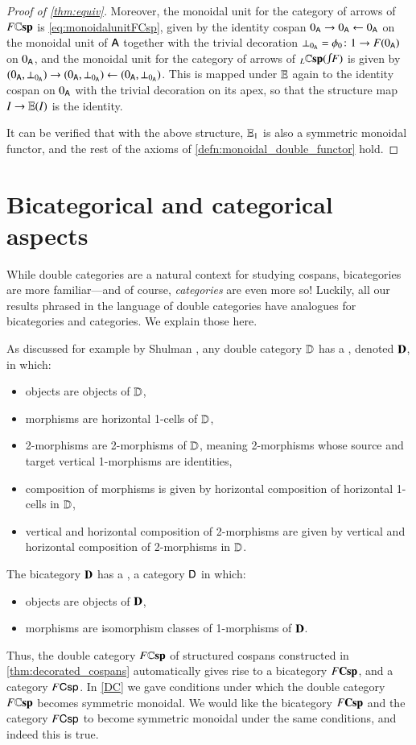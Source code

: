 \documentclass[reqno]{amsart}
\begin{document}
\begin{proof}[Proof of \cref{thm:equiv}]
Moreover, the monoidal unit for the category of arrows of $F\mathbf{\mathbb Csp}$ is \cref{eq:monoidalunitFCsp}, given by the identity cospan $0_{\mathsf{A}} \rightarrow 0_{\mathsf{A}} \leftarrow 0_{\mathsf{A}}$ on the monoidal unit of $\mathsf{A}$ together with the trivial decoration $\bot_{0_{\mathsf{A}}} = \phi_0 \colon 1 \to F(0_{\mathsf{A}})$ on $0_{\mathsf{A}}$, and the monoidal unit for the category of arrows of ${ _L \lCsp(\inta F)}$ is given by $(0_{\mathsf{A}},\bot_{0_{\mathsf{A}}}) \rightarrow (0_{\mathsf{A}},\bot_{0_{\mathsf{A}}}) \leftarrow (0_{\mathsf{A}},\bot_{0_{\mathsf{A}}})$. This is mapped under $\mathbf{\mathbb E}$ again to the identity cospan on $0_{\mathsf{A}}$ with the trivial decoration on its apex, so that the structure map %
$I\to\mathbf{\mathbb E}(I)$ is the identity.

It can be verified that with the above structure, $\mathbf{\mathbb E}_1$ is also a symmetric monoidal functor, and the rest of the axioms of \cref{defn:monoidal_double_functor} hold.
\end{proof}


\section{Bicategorical and categorical aspects}
\label{spinoffs}

While double categories are a natural context for studying cospans, bicategories are more 
familiar---and of course, \emph{categories} are even more so!   Luckily, all our results 
phrased in the language of double categories have analogues for bicategories and categories.  
We explain those here.

As discussed for example by Shulman \cite{Shulman2010}, any double category $\mathbf{\mathbb D}$ has a 
, denoted $\mathbf{D}$, in which:
\begin{itemize}
\item objects are objects of $\mathbf{\mathbb D}$,
\item morphisms are horizontal 1-cells of $\mathbf{\mathbb D}$,
\item 2-morphisms are  2-morphisms of $\mathbf{\mathbb D}$, meaning 2-morphisms whose source and target vertical 1-morphisms are identities,
\item composition of morphisms is given by horizontal composition of horizontal 1-cells in $\mathbf{\mathbb D}$,
\item vertical and horizontal composition of 2-morphisms are given by vertical and horizontal
composition of 2-morphisms in $\mathbf{\mathbb D}$.
\end{itemize}
The bicategory $\mathbf{D}$ has a , a category $\mathsf{D}$ in which:
\begin{itemize}
\item objects are objects of $\mathbf{D}$,
\item morphisms are isomorphism classes of 1-morphisms of $\mathbf{D}$.   
\end{itemize}
Thus, the double category $F\mathbf{\mathbb Csp}$ of structured cospans constructed in \cref{thm:decorated_cospans} automatically gives rise to a bicategory $F\mathbf{Csp}$, and a category $F\mathsf{Csp}$.   In \cref{DC} we gave conditions under which the double category $F\mathbf{\mathbb Csp}$ becomes symmetric monoidal.   We would like the bicategory $F\mathbf{Csp}$ and the category $F\mathsf{Csp}$ to become symmetric monoidal under the same conditions, and indeed this is true.   
\end{document}
